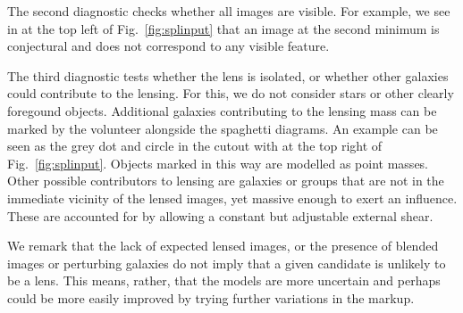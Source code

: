 The second diagnostic checks whether all images are visible.  For example,
we see in  at the top left of Fig.~\ref{fig:splinput} that an
image at the second minimum is conjectural and does not correspond to
any visible feature.

The third diagnostic tests whether the lens is isolated, or whether
other galaxies could contribute to the lensing.  For this, we do not
consider stars or other clearly foregound objects.  Additional
galaxies contributing to the lensing mass can be marked by the
volunteer alongside the spaghetti diagrams.  An example can be seen as
the grey dot and circle in the cutout with  at the top right of
Fig.~\ref{fig:splinput}.  Objects marked in this way are modelled as
point masses.  Other possible contributors to lensing are galaxies or
groups that are not in the immediate vicinity of the lensed images,
yet massive enough to exert an influence. These are accounted for by
allowing a constant but adjustable external shear.

We remark that the lack of expected lensed images, or the presence of
blended images or perturbing galaxies do not imply that a given
candidate is unlikely to be a lens.  This means, rather, that the
models are more uncertain and perhaps could be more easily improved by
trying further variations in the markup.

